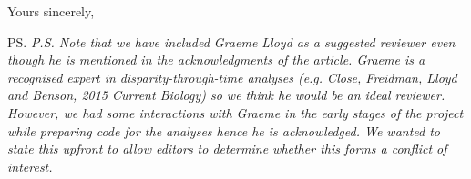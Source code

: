 \documentclass[11pt]{letter}
\begin{document}
\begin{letter}{}
\closing{Yours sincerely,}

\ps{\textit{P.S. Note that we have included Graeme Lloyd as a suggested reviewer even though he is mentioned in the acknowledgments of the article. Graeme is a recognised expert in disparity-through-time analyses (e.g. Close, Freidman, Lloyd and Benson, 2015 Current Biology) so we think he would be an ideal reviewer. However, we had some interactions with Graeme in the early stages of the project while preparing code for the analyses hence he is acknowledged. We wanted to state this upfront to allow editors to determine whether this forms a conflict of interest.}}

\end{letter}
\end{document}
